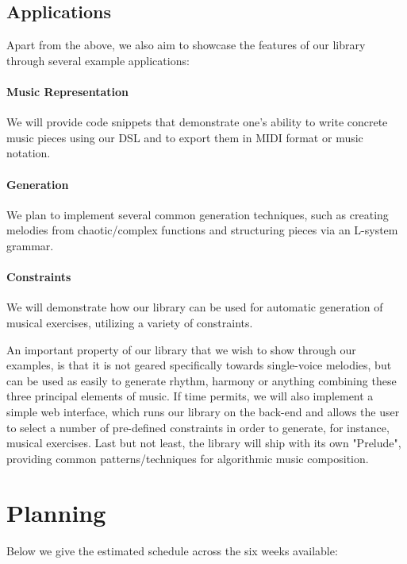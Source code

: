 \documentclass[11pt,a4paper]{article}
\begin{document}
\subsection{Applications}
Apart from the above, we also aim to showcase the features of our library through several example applications:
\vspace{-10pt}
\paragraph{Music Representation} We will provide code snippets that demonstrate one's ability to write concrete music pieces using our DSL and to export them in MIDI format or music notation.
\vspace{-10pt}
\paragraph{Generation} We plan to implement several common generation techniques, such as creating melodies from 
chaotic/complex functions\cite{chaos} and structuring pieces via an L-system grammar\cite{lsystem}.\vspace{-10pt}
\paragraph{Constraints} We will demonstrate how our library can be used for automatic generation of musical exercises, utilizing a variety of constraints.

An important property of our library that we wish to show through our examples, is that it is not geared specifically towards single-voice melodies, but can be used as easily to generate rhythm, harmony or anything combining these three principal elements of music.
If time permits, we will also implement a simple web interface, which runs our library on the back-end and allows the user to select a number of pre-defined constraints in order to generate, for instance, musical exercises.
Last but not least, the library will ship with its own "Prelude", providing common patterns/techniques for algorithmic music composition.

\section{Planning}
Below we give the estimated schedule across the six weeks available:
\vspace{.5cm}

\startchronology
{}
\stopchronology
\vspace{.5cm}



\end{document}
